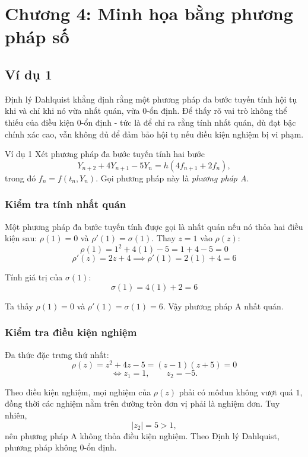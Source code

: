 \section{Chương 4: Minh họa bằng phương pháp số}
\subsection{Ví dụ 1}
Định lý Dahlquist khẳng định rằng một phương pháp đa bước tuyến tính hội tụ khi và chỉ khi nó vừa nhất quán, vừa 0-ổn định. Để thấy rõ vai trò không thể thiếu của điều kiện 0-ổn định - tức là để chỉ ra rằng tính nhất quán, dù đạt bậc chính xác cao, vẫn không đủ để đảm bảo hội tụ nếu điều kiện nghiệm bị vi phạm. 

\begin{vidu}{Ví dụ 1}
    Xét phương pháp đa bước tuyến tính hai bước
    \begin{equation*}
        Y_{n+2}+4Y_{n+1}-5Y_n=h\left(4f_{n+1}+2f_n\right),
    \end{equation*}
    trong đó $f_n=f(t_n,Y_n)$. Gọi phương pháp này là \emph{phương pháp A}.
\end{vidu}



\subsubsection*{Kiểm tra tính nhất quán}
Một phương pháp đa bước tuyến tính được gọi là nhất quán nếu nó thỏa hai điều kiện sau:
$\rho(1) = 0$ và $\rho'(1) = \sigma(1)$. 
Thay $z = 1$ vào $\rho(z)$:
$$\rho(1) = 1^2 + 4(1) - 5 = 1 + 4 - 5 = 0$$
$$\rho'(z) = 2z + 4 \implies \rho'(1) = 2(1) + 4 = 6$$

Tính giá trị của $\sigma(1)$:
$$\sigma(1) = 4(1) + 2 = 6$$

Ta thấy $\rho(1) = 0$ và $\rho'(1) = \sigma(1) = 6$. Vậy phương pháp A nhất quán. 

\subsubsection*{Kiểm tra điều kiện nghiệm}

Đa thức đặc trưng thứ nhất:
\[
\rho(z)=z^2+4z-5=(z-1)(z+5)=0
\]
\[
\Leftrightarrow z_1=1,\qquad z_2=-5.
\]

Theo điều kiện nghiệm, mọi nghiệm của $\rho(z)$ phải có môđun không vượt quá $1$, đồng thời các nghiệm nằm trên đường tròn đơn vị phải là nghiệm đơn. Tuy nhiên,
\[
|z_2|=5>1,
\]
nên phương pháp A không thỏa điều kiện nghiệm. Theo Định lý Dahlquist, phương pháp không 0-ổn định.

